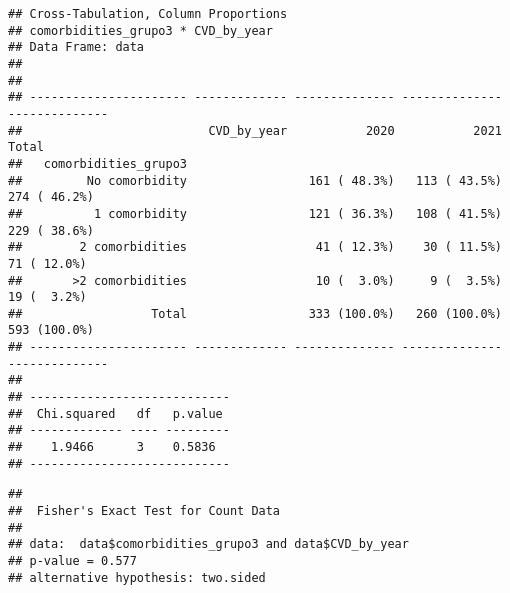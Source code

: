 \documentclass[
]{article}
\newenvironment{Shaded}{\begin{snugshade}}{\end{snugshade}}
\newcommand{\AttributeTok}[1]{\textcolor[rgb]{0.13,0.29,0.53}{#1}}
\newcommand{\ConstantTok}[1]{\textcolor[rgb]{0.56,0.35,0.01}{#1}}
\newcommand{\FunctionTok}[1]{\textcolor[rgb]{0.13,0.29,0.53}{\textbf{#1}}}
\newcommand{\NormalTok}[1]{#1}
\newcommand{\SpecialCharTok}[1]{\textcolor[rgb]{0.81,0.36,0.00}{\textbf{#1}}}
\newcommand{\StringTok}[1]{\textcolor[rgb]{0.31,0.60,0.02}{#1}}
\begin{document}
\begin{verbatim}
## Cross-Tabulation, Column Proportions  
## comorbidities_grupo3 * CVD_by_year  
## Data Frame: data  
## 
## 
## ---------------------- ------------- -------------- -------------- --------------
##                          CVD_by_year           2020           2021          Total
##   comorbidities_grupo3                                                           
##         No comorbidity                 161 ( 48.3%)   113 ( 43.5%)   274 ( 46.2%)
##          1 comorbidity                 121 ( 36.3%)   108 ( 41.5%)   229 ( 38.6%)
##        2 comorbidities                  41 ( 12.3%)    30 ( 11.5%)    71 ( 12.0%)
##       >2 comorbidities                  10 (  3.0%)     9 (  3.5%)    19 (  3.2%)
##                  Total                 333 (100.0%)   260 (100.0%)   593 (100.0%)
## ---------------------- ------------- -------------- -------------- --------------
## 
## ----------------------------
##  Chi.squared   df   p.value 
## ------------- ---- ---------
##    1.9466      3    0.5836  
## ----------------------------
\end{verbatim}

\begin{Shaded}
\end{Shaded}

\begin{verbatim}
## 
##  Fisher's Exact Test for Count Data
## 
## data:  data$comorbidities_grupo3 and data$CVD_by_year
## p-value = 0.577
## alternative hypothesis: two.sided
\end{verbatim}

\begin{Shaded}
\end{Shaded}
\end{document}
